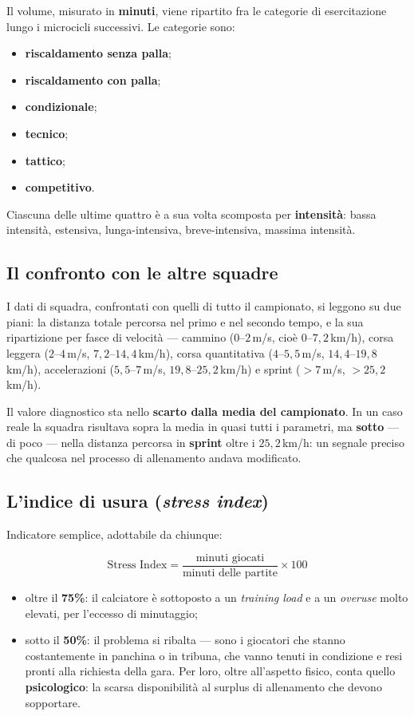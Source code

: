 Il volume, misurato in \textbf{minuti}, viene ripartito fra le categorie di esercitazione lungo i
microcicli successivi. Le categorie sono:

\begin{itemize}
  \item \textbf{riscaldamento senza palla};
  \item \textbf{riscaldamento con palla};
  \item \textbf{condizionale};
  \item \textbf{tecnico};
  \item \textbf{tattico};
  \item \textbf{competitivo}.
\end{itemize}

Ciascuna delle ultime quattro è a sua volta scomposta per \textbf{intensità}: bassa intensità,
estensiva, lunga-intensiva, breve-intensiva, massima intensità.

\subsection{Il confronto con le altre squadre}

I dati di squadra, confrontati con quelli di tutto il campionato, si leggono su due piani: la
distanza totale percorsa nel primo e nel secondo tempo, e la sua ripartizione per fasce di velocità
--- cammino ($0$--$2$\,m/s, cioè $0$--$7{,}2$\,km/h), corsa leggera ($2$--$4$\,m/s,
$7{,}2$--$14{,}4$\,km/h), corsa quantitativa ($4$--$5{,}5$\,m/s, $14{,}4$--$19{,}8$\,km/h),
accelerazioni ($5{,}5$--$7$\,m/s, $19{,}8$--$25{,}2$\,km/h) e sprint ($> 7$\,m/s,
$> 25{,}2$\,km/h).

Il valore diagnostico sta nello \textbf{scarto dalla media del campionato}. In un caso reale la
squadra risultava sopra la media in quasi tutti i parametri, ma \textbf{sotto} --- di poco --- nella
distanza percorsa in \textbf{sprint} oltre i $25{,}2$\,km/h: un segnale preciso che qualcosa nel
processo di allenamento andava modificato.

\subsection{L'indice di usura (\textit{stress index})}

Indicatore semplice, adottabile da chiunque:

\[
\text{Stress Index} = \frac{\text{minuti giocati}}{\text{minuti delle partite}} \times 100
\]

\begin{itemize}
  \item oltre il \textbf{75\%}: il calciatore è sottoposto a un \textit{training load} e a un
    \textit{overuse} molto elevati, per l'eccesso di minutaggio;
  \item sotto il \textbf{50\%}: il problema si ribalta --- sono i giocatori che stanno
    costantemente in panchina o in tribuna, che vanno tenuti in condizione e resi pronti alla
    richiesta della gara. Per loro, oltre all'aspetto fisico, conta quello \textbf{psicologico}: la
    scarsa disponibilità al surplus di allenamento che devono sopportare.
\end{itemize}

